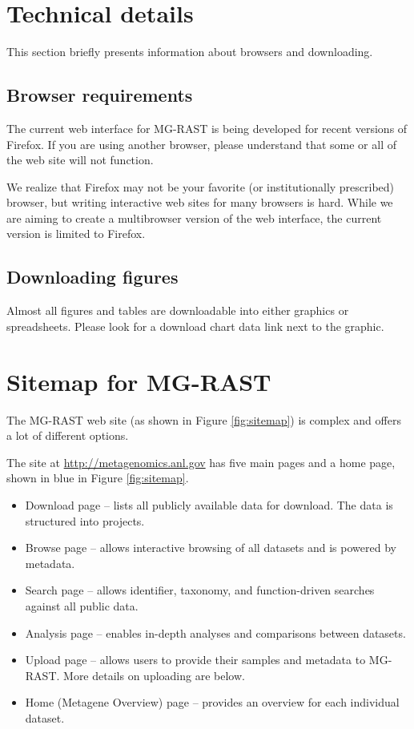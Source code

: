 \documentclass[12pt,fullpage]{report}
\begin{document}
\section{Technical details}
This section briefly presents information about browsers and downloading. 
\subsection{Browser requirements}
The current web interface for MG-RAST is being developed for recent versions of Firefox.
If you are using another browser, please understand that some or all of the web site will not function.

We realize that Firefox may not be your favorite (or institutionally prescribed) browser, but writing
interactive web sites for many browsers is hard. While we are aiming to create a multibrowser version of the web interface, the current version is limited to Firefox.

\subsection{Downloading figures}
Almost all figures and tables are downloadable into either graphics or spreadsheets. Please look for
a download chart data link next to the graphic.





\section{Sitemap for MG-RAST}
The MG-RAST web site (as shown in Figure \ref{fig:sitemap}) is complex and offers a lot of
different options.

The site at \url{http://metagenomics.anl.gov} has five main pages
and a home page,
shown in blue in Figure \ref{fig:sitemap}.

\begin{itemize}
\item Download page -- 
lists all publicly available data for download. The data is structured into projects.

\item Browse page --
allows interactive browsing of all datasets and is powered by metadata.

\item Search page --
allows identifier, taxonomy, and function-driven searches against all public data.

\item Analysis page --
enables in-depth analyses and comparisons between datasets.

\item Upload page --
allows users to provide their samples and metadata to MG-RAST. More details on uploading are below.

\item Home (Metagene Overview) page --
provides an overview
for each individual dataset.
\end{itemize}
\end{document}
